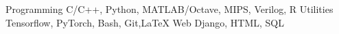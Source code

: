 \begin{cvskills}
  \cvskill
  {Programming}
  {C/C++, Python, MATLAB/Octave, MIPS, Verilog, R}
   \cvskill
  {Utilities}
  {Tensorflow, PyTorch, Bash, Git,\LaTeX}
   \cvskill
  {Web}
  {Django, HTML, SQL}
  \end{cvskills}
